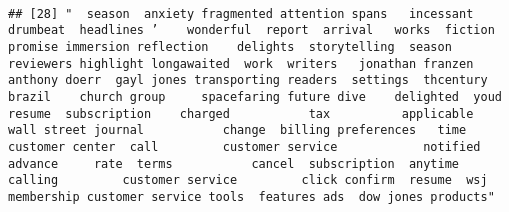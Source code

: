 \documentclass[
]{article}
\begin{document}
\begin{verbatim}
                                                                                                                                                                                                                                                                                                                                                                                                                                                                   
## [28] "  season  anxiety fragmented attention spans   incessant drumbeat  headlines ’    wonderful  report  arrival   works  fiction  promise immersion reflection    delights  storytelling  season  reviewers highlight longawaited  work  writers   jonathan franzen anthony doerr  gayl jones transporting readers  settings  thcentury brazil    church group     spacefaring future dive    delighted  youd   resume  subscription    charged           tax          applicable   wall street journal           change  billing preferences   time   customer center  call         customer service            notified  advance     rate  terms           cancel  subscription  anytime  calling         customer service         click confirm  resume  wsj membership customer service tools  features ads  dow jones products"                                                                                                                                                                                                                                                                                                                                                                                                                                                                                                                                                                                                                                                                                                                                                                                                                                                                                                                                                                                                                                                                                                                                                                                                                                                                                                                                                                                                                                                                                                                                                                                                                                                                                                                                                                                                                                                                                                                                                                                                                                                                                                                                         
\end{verbatim}
\end{document}
